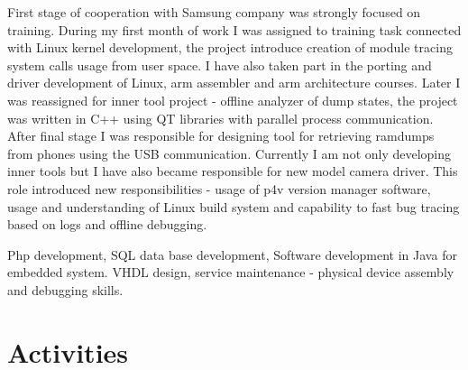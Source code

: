 \documentclass[8pt,a4paper]{moderncv}
\begin{document}
\vspace{4mm}
First stage of cooperation with Samsung company was strongly focused on training. During my first month of
work I was assigned to training task connected with Linux kernel development, the project introduce creation of
module tracing system calls usage from user space. I have also taken part in the porting and driver development
of Linux, arm assembler and arm architecture courses. Later I was reassigned for inner tool project - offline
analyzer of dump states, the project was written in C++ using QT libraries with parallel process communication.
After final stage I was responsible for designing tool for retrieving ramdumps from phones using the USB
communication. Currently I am not only developing inner tools but I have also became responsible for new model
camera driver. This role introduced new responsibilities - usage of p4v version manager software, usage and
understanding of Linux build system and capability to fast bug tracing based on logs and offline debugging.
\cvline{}{}

\vspace{4mm}
Php development, SQL data base development, Software development in Java for embedded system.
VHDL design, service maintenance - physical device assembly and debugging skills.

\cvline{}{}

\section{Activities}
\vspace{4mm}
\end{document}
